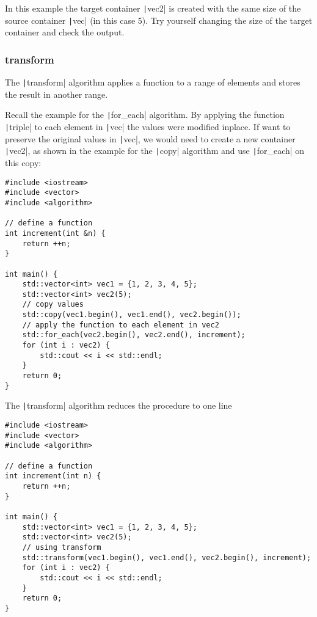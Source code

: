 \documentclass{article}
\begin{document}
In this example the target container \texttt|vec2| is created with the same size of the source container \texttt|vec| (in this case 5). Try yourself changing the size of the target container and check the output.

\subsubsection{transform}
The \texttt|transform| algorithm applies a function to a range of elements and stores the result in another range. 

Recall the example for the \texttt|for_each| algorithm. By applying the function \texttt|triple| to each element in \texttt|vec| the values were modified inplace. If want to preserve the original values in \texttt|vec|, we would need to create a new container \texttt|vec2|, as shown in the example for the \texttt|copy| algorithm and use \texttt|for_each| on this copy:

\begin{verbatim}
#include <iostream>
#include <vector>
#include <algorithm>

// define a function
int increment(int &n) {
    return ++n;
}

int main() {
    std::vector<int> vec1 = {1, 2, 3, 4, 5};
    std::vector<int> vec2(5);
    // copy values
    std::copy(vec1.begin(), vec1.end(), vec2.begin());
    // apply the function to each element in vec2
    std::for_each(vec2.begin(), vec2.end(), increment);
    for (int i : vec2) {
        std::cout << i << std::endl;
    }
    return 0;
}
\end{verbatim}

The \texttt|transform| algorithm reduces the procedure to one line

\begin{verbatim}
#include <iostream>
#include <vector>
#include <algorithm>

// define a function
int increment(int n) {
    return ++n;
}

int main() {
    std::vector<int> vec1 = {1, 2, 3, 4, 5};
    std::vector<int> vec2(5);
    // using transform
    std::transform(vec1.begin(), vec1.end(), vec2.begin(), increment);
    for (int i : vec2) {
        std::cout << i << std::endl;
    }
    return 0;
}
\end{verbatim}
\end{document}
